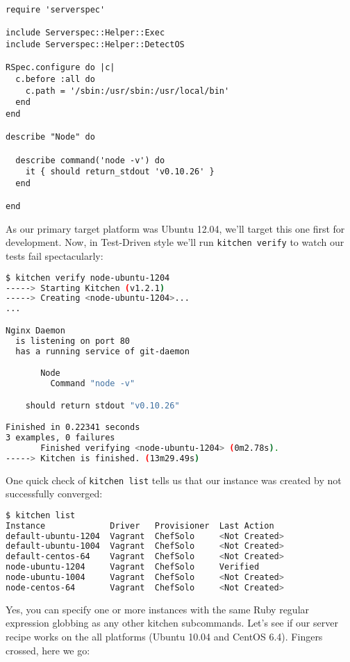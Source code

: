 \begin{lstlisting}[label=lst:testing-test-kitchen39]
require 'serverspec'

include Serverspec::Helper::Exec
include Serverspec::Helper::DetectOS

RSpec.configure do |c|
  c.before :all do
    c.path = '/sbin:/usr/sbin:/usr/local/bin'
  end
end

describe "Node" do

  describe command('node -v') do
    it { should return_stdout 'v0.10.26' }
  end

end
\end{lstlisting}

As our primary target platform was Ubuntu 12.04, we'll target this one first for development. Now, in Test-Driven style we'll run \lstinline!kitchen verify! to watch our tests fail spectacularly:

\begin{lstlisting}[language=Bash,label=lst:testing-test-kitchen40]
$ kitchen verify node-ubuntu-1204
-----> Starting Kitchen (v1.2.1)
-----> Creating <node-ubuntu-1204>...
...

Nginx Daemon
  is listening on port 80
  has a running service of git-daemon

       Node
         Command "node -v"

    should return stdout "v0.10.26"

Finished in 0.22341 seconds
3 examples, 0 failures
       Finished verifying <node-ubuntu-1204> (0m2.78s).
-----> Kitchen is finished. (13m29.49s)

\end{lstlisting}

One quick check of \lstinline!kitchen list! tells us that our instance was created by not successfully converged:

\begin{lstlisting}[language=Bash,label=lst:testing-test-kitchen41]
$ kitchen list
Instance             Driver   Provisioner  Last Action
default-ubuntu-1204  Vagrant  ChefSolo     <Not Created>
default-ubuntu-1004  Vagrant  ChefSolo     <Not Created>
default-centos-64    Vagrant  ChefSolo     <Not Created>
node-ubuntu-1204     Vagrant  ChefSolo     Verified
node-ubuntu-1004     Vagrant  ChefSolo     <Not Created>
node-centos-64       Vagrant  ChefSolo     <Not Created>
\end{lstlisting}

Yes, you can specify one or more instances with the same Ruby regular expression globbing as any other kitchen subcommands. Let's see if our server recipe works on the all platforms (Ubuntu 10.04 and CentOS 6.4). Fingers crossed, here we go:

